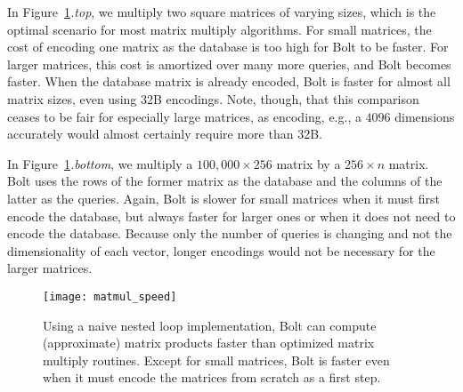 In Figure~\ref{fig:matmul_speed}\textit{.top}, we multiply two square matrices of varying sizes, which is the optimal scenario for most matrix multiply algorithms. For small matrices, the cost of encoding one matrix as the database is too high for Bolt to be faster. For larger matrices, this cost is amortized over many more queries, and Bolt becomes faster. When the database matrix is already encoded, Bolt is faster for almost all matrix sizes, even using 32B encodings. Note, though, that this comparison ceases to be fair for especially large matrices, as encoding, e.g., a $4096$ dimensions accurately would almost certainly require more than 32B. %

In Figure~\ref{fig:matmul_speed}\textit{.bottom}, we multiply a $100,000 \times 256$ matrix by a $256 \times n$ matrix. Bolt uses the rows of the former matrix as the database and the columns of the latter as the queries. Again, Bolt is slower for small matrices when it must first encode the database, but always faster for larger ones or when it does not need to encode the database. Because only the number of queries is changing and not the dimensionality of each vector, longer encodings would not be necessary for the larger matrices.


\begin{figure}[h]
\begin{center}
\texttt{[image: matmul\_speed]}
\caption{Using a naive nested loop implementation, Bolt can compute (approximate) matrix products faster than optimized matrix multiply routines. Except for small matrices, Bolt is faster even when it must encode the matrices from scratch as a first step.}
\label{fig:matmul_speed}
\end{center}
\end{figure}



